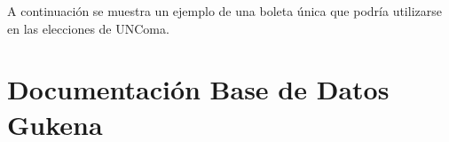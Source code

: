 A continuación se muestra un ejemplo de una boleta única que podría utilizarse en las elecciones de UNComa.



\chapter{Documentación Base de Datos Gukena}
\label{DBGukena}



